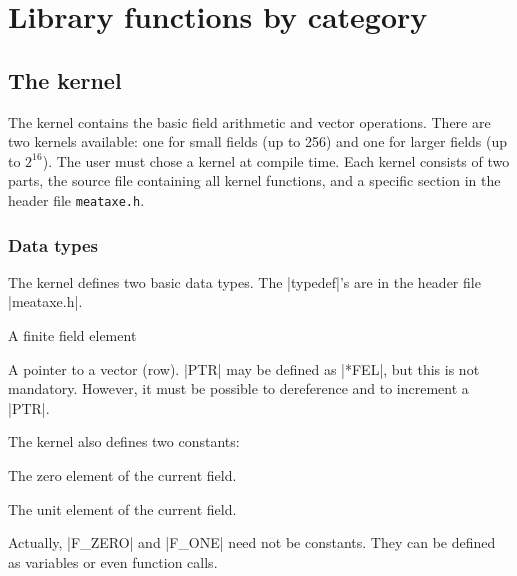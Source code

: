 {\section{Library functions by category}

\def\Shortlist{\begin{list}{}{\leftmargin 4cm\labelwidth 38mm%
\labelsep 2mm\itemsep 0mm\parsep 0mm}}
\def\ShortlistEnd{\end{list}}
\def\Short#1#2{\item[{\tt #1}\hfill]#2}



\subsection{The kernel}\label{sec:kernel}

The kernel contains the basic field arithmetic and vector operations.
There are two kernels available: one for small fields (up to 256) and
one for larger fields (up to $2^{16}$). The user must chose a kernel at
compile time.
Each kernel consists of two parts, the source file containing all
kernel functions, and a specific section in the {\MeatAxe} header
file \verb"meataxe.h".

\subsubsection{Data types}
The kernel defines two basic data types. The |typedef|'s are
in the header file |meataxe.h|.
\Shortlist
\Short{FEL}{A finite field element}
\Short{PTR}{A pointer to a vector (row). |PTR| may be defined as
	|*FEL|, but this is not mandatory. However, it must be
	possible to dereference and to increment a |PTR|.}
\ShortlistEnd
The kernel also defines two constants:
\Shortlist
\Short{F\_ZERO}{The zero element of the current field.}
\Short{F\_ONE}{The unit element of the current field.}
\ShortlistEnd
Actually, |F_ZERO| and |F_ONE| need not be constants. They
can be defined as variables or even function calls.

}
